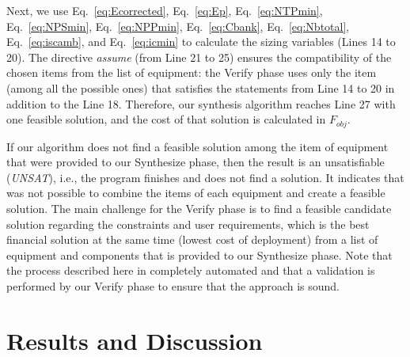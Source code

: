 \documentclass[10pt,conference]{IEEEtran}
\begin{document}
Next, we use Eq.~\eqref{eq:Ecorrected}, Eq.~\eqref{eq:Ep}, Eq.~\eqref{eq:NTPmin}, Eq.~\eqref{eq:NPSmin}, Eq.~\eqref{eq:NPPmin}, Eq.~\eqref{eq:Cbank}, Eq.~\eqref{eq:Nbtotal}, Eq.~\eqref{eq:iscamb}, and Eq.~\eqref{eq:icmin} to calculate the sizing variables (Lines 14 to 20). The directive \textit{assume} (from Line 21 to 25) ensures the compatibility of the chosen items from the list of equipment: the {\sc Verify} phase uses only the item (among all the possible ones) that satisfies the statements from Line 14 to 20 in addition to the Line 18. Therefore, our synthesis algorithm reaches Line 27 with one feasible solution, and the cost of that solution is calculated in $F_{obj}$.

If our algorithm does not find a feasible solution among the item of equipment that were provided to our {\sc Synthesize} phase,  then the result is an unsatisfiable (\textit{UNSAT}), i.e., the program finishes and does not find a solution. It indicates that was not possible to combine the items of each equipment and create a feasible solution. The main challenge for the {\sc Verify} phase is to find a feasible candidate solution regarding the constraints and user requirements, which is the best financial solution at the same time (lowest cost of deployment) from a list of equipment and components that is provided to our {\sc Synthesize} phase. Note that the process described here in completely automated and that a validation is performed by our {\sc Verify} phase to ensure that the approach is sound.

\section{Results and Discussion}
\end{document}
